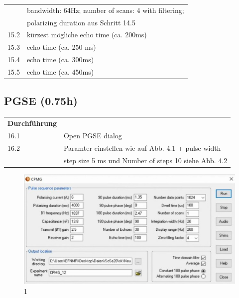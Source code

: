 \begin{tabular}{ll}
         &  bandwidth: 64Hz; number of scans: 4 with filtering; \\

         & polarizing duration aus Schritt 14.5 \\

    15.2 & kürzest mögliche echo time (ca. 200ms) \\

    15.3 & echo time (ca. 250 ms) \\

    15.4 & echo time (ca. 300ms) \\

    15.5 & echo time (ca. 450ms) \\

\end{tabular}  

\subsection{PGSE (0.75h)}


\begin{tabular}{ll}
    \textbf{Durchführung} & \\

    16.1 & Open PGSE dialog \\

    16.2 & Paramter einstellen wie auf Abb. 4.1 + pulse width  \\

         & step size 5 ms und Number of steps 10 siehe Abb. 4.2 \\

\end{tabular}  

\begin{figure}[H]
\includegraphics[width = \textwidth]{1.png}
\caption{1}
\label{1}
\end{figure}

